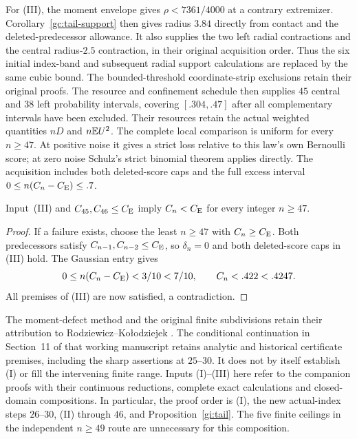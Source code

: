 
For (III), the moment envelope gives $\rho<7361/4000$ at a contrary
extremizer. Corollary~\ref{gc:tail-support} then gives radius $3.84$
directly from contact and the deleted-predecessor allowance.
It also supplies the two left radial contractions and the central
radius-$2.5$ contraction, in their original acquisition order.
Thus the six initial index-band and subsequent radial support
calculations are replaced by the same cubic bound. The bounded-threshold
coordinate-strip exclusions retain their original proofs.
The resource and confinement schedule then supplies $45$ central
and $38$ left probability intervals, covering $[.304,.47]$ after
all complementary intervals have been excluded. Their resources
retain the actual weighted quantities $nD$ and $n\mathbb E U^2$.
The complete local comparison is uniform for every $n\ge47$.
At positive noise it gives a strict loss relative to this law's
own Bernoulli score; at zero noise Schulz's strict binomial theorem
applies directly. The acquisition includes both deleted-score caps
and the full excess interval $0\le n(C_n-C_{\mathrm E})\le.7$.

\begin{proposition}\label{gi:tail}
Input~(III) and $C_{45},C_{46}\le C_{\mathrm E}$ imply
$C_n<C_{\mathrm E}$ for every integer $n\ge47$.
\end{proposition}
\begin{proof}
If a failure exists, choose the least $n\ge47$ with $C_n\ge C_{\mathrm E}$.
Both predecessors satisfy $C_{n-1},C_{n-2}\le C_{\mathrm E}$, so $\delta_n=0$
and both deleted-score caps in (III) hold. The Gaussian entry gives
\[
 0\le n(C_n-C_{\mathrm E})<3/10<7/10,\qquad
 C_n<.422<.4247.
\]
All premises of (III) are now satisfied, a contradiction.
\end{proof}

The moment-defect method and the original finite subdivisions retain
their attribution to Rodziewicz--Ko\l{}odziejek \cite{RK2026}.
The conditional continuation in Section~11 of that working manuscript
retains analytic and historical certificate premises, including the
sharp assertions at $25$--$30$. It does not by itself establish (I) or
fill the intervening finite range. Inputs (I)--(III) here refer to the
companion proofs with their continuous reductions, complete exact
calculations and closed-domain compositions. In particular, the proof
order is (I), the new actual-index steps $26$--$30$, (II) through
$46$, and Proposition~\ref{gi:tail}. The five finite ceilings in
the independent $n\ge49$ route are unnecessary for this composition.
